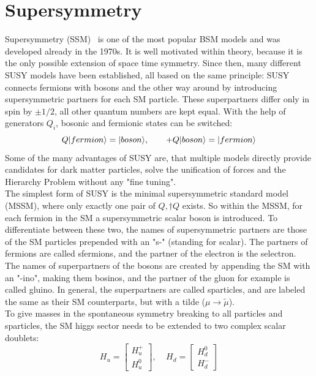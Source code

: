 \section{Supersymmetry}\label{sec:SUSY}
Supersymmetry (SSM)~\cite{SUSYOriginal,SUSYPrimer} is one of the most popular BSM models and was developed already in the 1970s. It is well motivated within theory, because it is the only possible extension of space time symmetry. Since then, many different SUSY models have been established, all based on the same principle: SUSY connects fermions with bosons and the other way around by introducing supersymmetric partners for each SM particle. These superpartners differ only in spin by $\pm1/2$, all other quantum numbers are kept equal. With the help of generators $Q_i$, bosonic and fermionic states can be switched:
\begin{equation}
 Q\lvert fermion\rangle=\lvert boson\rangle,~~~~~~+ Q\lvert boson\rangle=\lvert fermion\rangle
\end{equation}
Some of the many advantages of SUSY are, that multiple models directly provide candidates for dark matter particles, solve the unification of forces and the Hierarchy Problem without any "fine tuning".\\
The simplest form of SUSY is the minimal supersymmetric standard model (MSSM), where only exactly one pair of $Q,\dagger{Q}$ exists. So within the MSSM, for each fermion in the SM a supersymmetric scalar boson is introduced. To differentiate between these two, the names of supersymmetric partners are those of the SM particles prepended with an "s-" (standing for scalar). The partners of fermions are called sfermions, and \eg the partner of the electron is the selectron. The names of superpartners of the bosons are created by appending the SM with an "-ino", making them bosinos, and the partner of the gluon for example is called gluino. In general, the superpartners are called sparticles, and are labeled the same as their SM counterparts, but with a tilde ($\mu \to \widetilde{\mu}$).\\
To give masses in the spontaneous symmetry breaking to all particles and sparticles, the SM higgs sector needs to be extended to two complex scalar doublets:
\begin{equation}
 H_u=  \left[
  \begin{matrix}
   H_u^+ \\
   H_u^0
  \end{matrix}
  \right],~~~~~
 H_d=  \left[
  \begin{matrix}
   H_d^0 \\
   H_d^-
  \end{matrix}
  \right]
\end{equation}
